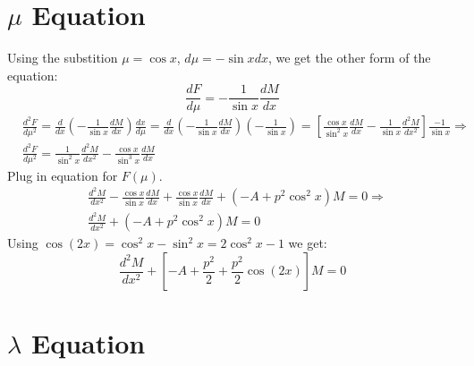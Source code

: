 \section{$ \mu $ Equation}
Using the substition $ \mu = \cos x $, $ d\mu = -\sin x dx $,  we get the other form of the equation:
\begin{equation}
\frac{dF}{d\mu} = -\frac{1}{\sin x}\frac{d M}{d x}
\end{equation}
\begin{equation}
\begin{split}
& \frac{d^2F}{d\mu^2} = \frac{d}{d x}\left(-\frac{1}{\sin x}\frac{d M}{d x}\right)\frac{d x}{d \mu} = \frac{d}{d x}\left(-\frac{1}{\sin x}\frac{d M}{d x}\right)\left(-\frac{1}{\sin x}\right) = \left[\frac{\cos x}{\sin^2 x}\frac{d M}{d x} - \frac{1}{\sin x}\frac{d^2 M}{d x^2}\right]\frac{-1}{\sin x} \Rightarrow \\[.8em]
& \frac{d^2 F}{d\mu^2} = \frac{1}{\sin^2 x}\frac{d^2 M}{d x^2} - \frac{\cos x}{\sin^3 x}\frac{d M}{d x}
\end{split}
\end{equation}
Plug in equation for $ F(\mu) $.
\begin{equation}\label{Feq}
\begin{split}
& \frac{d^2 M}{d x^2} - \frac{\cos x}{\sin x}\frac{d M}{d x} + \frac{\cos x}{\sin x}\frac{d M}{d x} + \left(-A + p^2\cos^2 x\right) M = 0 \Rightarrow \\[.8em]
& \frac{d^2 M}{d x^2} + \left(-A + p^2\cos^2x\right)M = 0
\end{split}
\end{equation}
Using $ \cos(2x) = \cos^2x - \sin^2x = 2\cos^2x - 1 $ we get:
\begin{equation}\label{Feq2-C}
\frac{d^2 M}{d x^2} + \left[-A + \frac{p^2}{2} + \frac{p^2}{2}\cos(2x) \right]M = 0 
\end{equation}

\section{$ \lambda $ Equation}

